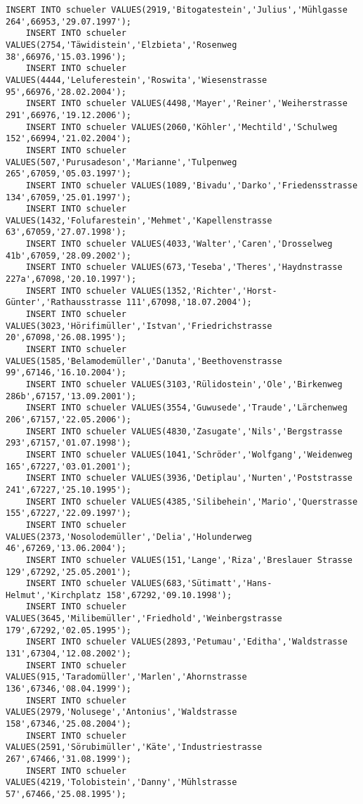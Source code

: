 \begin{lstlisting}[breaklines=True, numbers=none, basicstyle=\tiny, keepspaces=false]
	INSERT INTO schueler VALUES(2919,'Bitogatestein','Julius','Mühlgasse 264',66953,'29.07.1997');
	INSERT INTO schueler VALUES(2754,'Täwidistein','Elzbieta','Rosenweg 38',66976,'15.03.1996');
	INSERT INTO schueler VALUES(4444,'Leluferestein','Roswita','Wiesenstrasse 95',66976,'28.02.2004');
	INSERT INTO schueler VALUES(4498,'Mayer','Reiner','Weiherstrasse 291',66976,'19.12.2006');
	INSERT INTO schueler VALUES(2060,'Köhler','Mechtild','Schulweg 152',66994,'21.02.2004');
	INSERT INTO schueler VALUES(507,'Purusadeson','Marianne','Tulpenweg 265',67059,'05.03.1997');
	INSERT INTO schueler VALUES(1089,'Bivadu','Darko','Friedensstrasse 134',67059,'25.01.1997');
	INSERT INTO schueler VALUES(1432,'Folufarestein','Mehmet','Kapellenstrasse 63',67059,'27.07.1998');
	INSERT INTO schueler VALUES(4033,'Walter','Caren','Drosselweg 41b',67059,'28.09.2002');
	INSERT INTO schueler VALUES(673,'Teseba','Theres','Haydnstrasse 227a',67098,'20.10.1997');
	INSERT INTO schueler VALUES(1352,'Richter','Horst-Günter','Rathausstrasse 111',67098,'18.07.2004');
	INSERT INTO schueler VALUES(3023,'Hörifimüller','Istvan','Friedrichstrasse 20',67098,'26.08.1995');
	INSERT INTO schueler VALUES(1585,'Belamodemüller','Danuta','Beethovenstrasse 99',67146,'16.10.2004');
	INSERT INTO schueler VALUES(3103,'Rülidostein','Ole','Birkenweg 286b',67157,'13.09.2001');
	INSERT INTO schueler VALUES(3554,'Guwusede','Traude','Lärchenweg 206',67157,'22.05.2006');
	INSERT INTO schueler VALUES(4830,'Zasugate','Nils','Bergstrasse 293',67157,'01.07.1998');
	INSERT INTO schueler VALUES(1041,'Schröder','Wolfgang','Weidenweg 165',67227,'03.01.2001');
	INSERT INTO schueler VALUES(3936,'Detiplau','Nurten','Poststrasse 241',67227,'25.10.1995');
	INSERT INTO schueler VALUES(4385,'Silibehein','Mario','Querstrasse 155',67227,'22.09.1997');
	INSERT INTO schueler VALUES(2373,'Nosolodemüller','Delia','Holunderweg 46',67269,'13.06.2004');
	INSERT INTO schueler VALUES(151,'Lange','Riza','Breslauer Strasse 129',67292,'25.05.2001');
	INSERT INTO schueler VALUES(683,'Sütimatt','Hans-Helmut','Kirchplatz 158',67292,'09.10.1998');
	INSERT INTO schueler VALUES(3645,'Milibemüller','Friedhold','Weinbergstrasse 179',67292,'02.05.1995');
	INSERT INTO schueler VALUES(2893,'Petumau','Editha','Waldstrasse 131',67304,'12.08.2002');
	INSERT INTO schueler VALUES(915,'Taradomüller','Marlen','Ahornstrasse 136',67346,'08.04.1999');
	INSERT INTO schueler VALUES(2979,'Nolusege','Antonius','Waldstrasse 158',67346,'25.08.2004');
	INSERT INTO schueler VALUES(2591,'Sörubimüller','Käte','Industriestrasse 267',67466,'31.08.1999');
	INSERT INTO schueler VALUES(4219,'Tolobistein','Danny','Mühlstrasse 57',67466,'25.08.1995');

\end{lstlisting}
